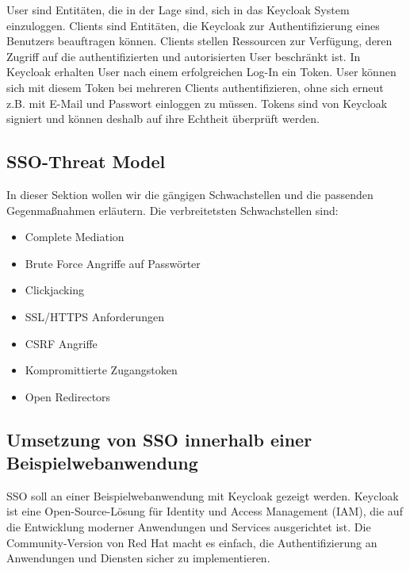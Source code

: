 \documentclass[12pt]{article}
\begin{document}
User sind Entitäten, die in der Lage sind, sich in das Keycloak System einzuloggen. Clients sind Entitäten, die Keycloak zur Authentifizierung eines Benutzers beauftragen können. Clients stellen Ressourcen zur Verfügung, deren Zugriff auf die authentifizierten und autorisierten User beschränkt ist. In Keycloak erhalten User nach einem erfolgreichen Log-In ein Token. User können sich mit diesem Token bei mehreren Clients authentifizieren, ohne sich erneut z.B. mit E-Mail und Passwort einloggen zu müssen. Tokens sind von Keycloak signiert und können deshalb auf ihre Echtheit überprüft werden.

\subsection{SSO-Threat Model}
In dieser Sektion wollen wir die gängigen Schwachstellen und die passenden Gegenmaßnahmen erläutern.
Die verbreitetsten Schwachstellen sind:

\begin{itemize}
	\item Complete Mediation \cite{RFC6819}
		
	\item Brute Force Angriffe auf Passwörter \cite{RFC6819}
		
	\item Clickjacking \cite{RFC6819}
	
	\item SSL/HTTPS Anforderungen \cite{RFC6819}
	
	\item CSRF Angriffe \cite{RFC6819}
	
	\item Kompromittierte Zugangstoken \cite{RFC6819}
	
	\item Open Redirectors \cite{RFC6819}
\end{itemize}

\subsection{Umsetzung von SSO innerhalb einer Beispielwebanwendung}
SSO soll an einer Beispielwebanwendung mit Keycloak gezeigt werden. Keycloak ist eine Open-Source-Lösung für Identity und Access Management (IAM), die auf die Entwicklung moderner Anwendungen und Services ausgerichtet ist. Die Community-Version von Red Hat macht es einfach, die Authentifizierung an Anwendungen und Diensten sicher zu implementieren.
\end{document}
